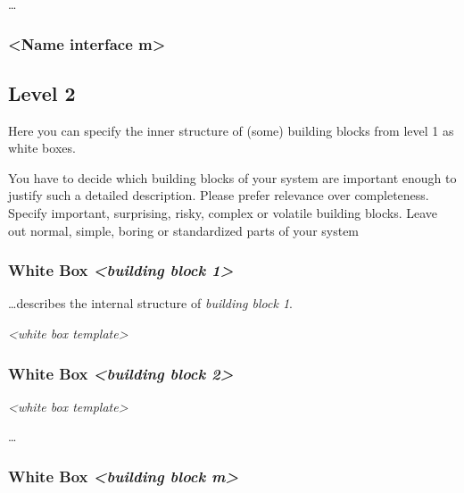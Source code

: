 \documentclass[
]{article}
\begin{document}
\ldots{}

\hypertarget{__name_interface_m}{%
\subsubsection{\textless Name interface
m\textgreater{}}\label{__name_interface_m}}

\hypertarget{_level_2}{%
\subsection{Level 2}\label{_level_2}}

Here you can specify the inner structure of (some) building blocks from
level 1 as white boxes.

You have to decide which building blocks of your system are important
enough to justify such a detailed description. Please prefer relevance
over completeness. Specify important, surprising, risky, complex or
volatile building blocks. Leave out normal, simple, boring or
standardized parts of your system

\hypertarget{_white_box_emphasis_building_block_1_emphasis}{%
\subsubsection{\texorpdfstring{White Box \emph{\textless building block
1\textgreater{}}}{White Box \textless building block 1\textgreater{}}}\label{_white_box_emphasis_building_block_1_emphasis}}

\ldots describes the internal structure of \emph{building block 1}.

\emph{\textless white box template\textgreater{}}

\hypertarget{_white_box_emphasis_building_block_2_emphasis}{%
\subsubsection{\texorpdfstring{White Box \emph{\textless building block
2\textgreater{}}}{White Box \textless building block 2\textgreater{}}}\label{_white_box_emphasis_building_block_2_emphasis}}

\emph{\textless white box template\textgreater{}}

\ldots{}

\hypertarget{_white_box_emphasis_building_block_m_emphasis}{%
\subsubsection{\texorpdfstring{White Box \emph{\textless building block
m\textgreater{}}}{White Box \textless building block m\textgreater{}}}\label{_white_box_emphasis_building_block_m_emphasis}}
\end{document}
